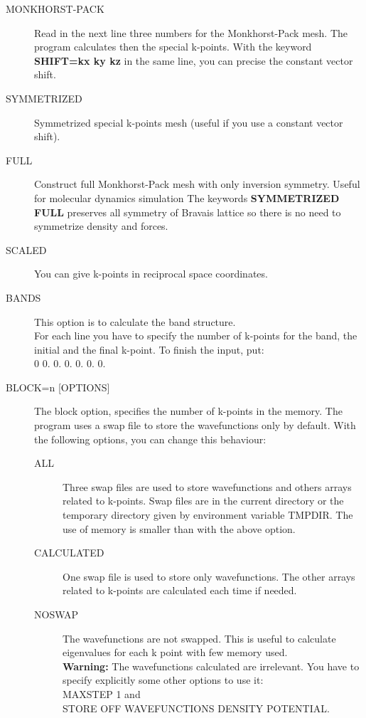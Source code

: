 \documentclass[twoside,10pt,titlepage,a4paper]{article}
\begin{document}
    \begin{description}

    \item[MONKHORST-PACK]
      Read in the next line three numbers for the Monkhorst-Pack mesh. The
        program calculates then the special k-points. With the keyword {\bf
        SHIFT=kx ky kz} in the same line, you can precise the constant vector
        shift.

    \item[SYMMETRIZED]
      Symmetrized special k-points mesh (useful if you use a constant vector
        shift).

    \item[FULL]
      Construct full Monkhorst-Pack mesh with only inversion symmetry. Useful
        for molecular dynamics simulation The keywords {\bf SYMMETRIZED FULL}
        preserves all symmetry of Bravais lattice so there is no need to
        symmetrize density and forces.
    \item[SCALED]
      You can give k-points in reciprocal space coordinates.
    \item[BANDS]
      This option is to calculate the band structure.\\
%
      For each line you have to specify the number of k-points for the band,
        the initial and the final k-point.
%
        To finish the input, put:\\
          0  0. 0. 0.  0. 0. 0.
    \item[BLOCK=n {[OPTIONS]}]
      The block option, specifies the number of k-points in the memory. The
        program uses a swap file to store the wavefunctions only by default.
        With the following options, you can change this behaviour:
    \begin{description}
      \item[ALL]
        Three swap files are used to store wavefunctions and others arrays
          related to k-points. Swap files are in the current directory or the
          temporary directory given by environment variable TMPDIR. The use of
          memory is smaller than with the above option.

      \item[CALCULATED]
        One swap file is used to store only wavefunctions. The other arrays
          related to k-points are calculated each time if needed.

      \item[NOSWAP]

        The wavefunctions are not swapped. This is useful to
          calculate eigenvalues for each k point with few memory used.\\
%
        {\bf Warning:} The wavefunctions calculated are irrelevant. You have to
          specify explicitly some other options to use it:\\
          MAXSTEP 1 and \\ STORE OFF WAVEFUNCTIONS DENSITY POTENTIAL.
      \end{description}
    \end{description}
\end{document}

